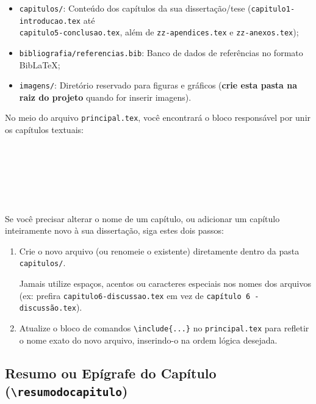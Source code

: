 \documentclass[12pt, a4paper]{article}
\begin{document}
\begin{itemize}
\begin{itemize}
    \end{itemize}
    \item \texttt{capitulos/}: Conteúdo dos capítulos da sua dissertação/tese (\texttt{capitulo1-introducao.tex} até \\ \texttt{capitulo5-conclusao.tex}, além de \texttt{zz-apendices.tex} e \texttt{zz-anexos.tex});
    \item \texttt{bibliografia/referencias.bib}: Banco de dados de referências no formato BibLaTeX;
    \item \texttt{imagens/}: Diretório reservado para figuras e gráficos (\textbf{crie esta pasta na raiz do projeto} quando for inserir imagens).
\end{itemize}

No meio do arquivo \texttt{principal.tex}, você encontrará o bloco responsável por unir os capítulos textuais:

\begin{verbatim}
  
  
  
  
  
\end{verbatim}

Se você precisar alterar o nome de um capítulo, ou adicionar um capítulo inteiramente novo à sua dissertação, siga estes dois passos:

\begin{enumerate}
    \item Crie o novo arquivo (ou renomeie o existente) diretamente dentro da pasta \texttt{capitulos/}. 
    
    \begin{atencao}
    Jamais utilize espaços, acentos ou caracteres especiais nos nomes dos arquivos (ex: prefira \texttt{capitulo6-discussao.tex} em vez de \texttt{capítulo 6 - discussão.tex}).
    \end{atencao}
    
    \item Atualize o bloco de comandos \texttt{\textbackslash include\{...\}} no \texttt{principal.tex} para refletir o nome exato do novo arquivo, inserindo-o na ordem lógica desejada.
\end{enumerate}

\subsection{Resumo ou Epígrafe do Capítulo (\texttt{\textbackslash resumodocapitulo})}
\end{document}
